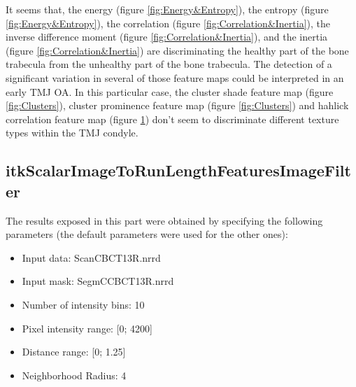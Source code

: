\documentclass{InsightArticle}
\begin{document}
\begin{figure}[H]
\begin{center}
    \label{fig:Haralick}
  \end{center}
\end{figure}

It seems that, the energy (figure \ref{fig:Energy&Entropy}), the entropy (figure \ref{fig:Energy&Entropy}), the correlation (figure \ref{fig:Correlation&Inertia}), the inverse difference moment (figure \ref{fig:Correlation&Inertia}), and the inertia (figure \ref{fig:Correlation&Inertia}) are discriminating the healthy part of the bone trabecula from the unhealthy part of the bone trabecula. The detection of a significant variation in several of those feature maps could be interpreted in an early TMJ OA. In this particular case, the cluster shade feature map (figure \ref{fig:Clusters}), cluster prominence feature map (figure \ref{fig:Clusters}) and hahlick correlation feature map (figure \ref{fig:Haralick}) don't seem to discriminate different texture types within the TMJ condyle.



\subsection{itkScalarImageToRunLengthFeaturesImageFilter}
\label{RLResults}

The results exposed in this part were obtained by specifying the following parameters (the default parameters were used for the other ones):

\begin{itemize}
 \item Input data: Scan\textunderscore CBCT\textunderscore 13R.nrrd
 \item Input mask: SegmC\textunderscore CBCT\textunderscore 13R.nrrd
 \item Number of intensity bins: 10
 \item Pixel intensity range: [0; 4200]
 \item Distance range: [0; 1.25]
 \item Neighborhood Radius: 4
\end{itemize}
\end{document}
